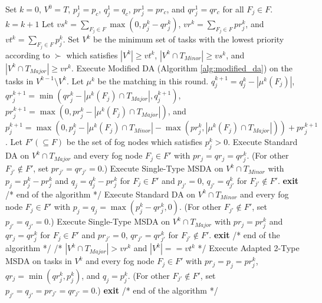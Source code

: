\begin{algorithm}[htbp]
\caption{Adapted 2-Type MSDA Algorithm}
\label{alg:two_type_msda}
\begin{algorithmic}[1]
\STATE Set $k = 0$, $V^0 = T$, $p_j^1 = p_c$, $q_j^1 = q_c$, $pr_j^1 = pr_c$, and $qr_j^1 = qr_c$ for all $F_j \in F$.
\REPEAT
    \STATE $k = k + 1$
    \STATE Let $vs^k = \sum_{F_j \in F} \max(0, p_j^k - qr_j^k)$, $vr^k = \sum_{F_j \in F} pr_j^k$, and $vt^k = \sum_{F_j \in F} p_j^k$.
    \STATE Set $V^k$ be the minimum set of tasks with the lowest priority according to $\succ$ which satisfies $|V^k| \geq vt^k$, $|V^k \cap T_{Minor}| \geq vs^k$, and $|V^k \cap T_{Major}| \geq vr^k$.
        \STATE Execute Modified DA (Algorithm \ref{alg:modified_da}) on the tasks in $V^{k-1} \setminus V^k$. Let $\mu^k$ be the matching in this round.
            \STATE $q_j^{k+1} = q_j^k - |\mu^k(F_j)|$,
            \STATE $qr_j^{k+1} = \min(qr_j^k - |\mu^k(F_j) \cap T_{Major}|, q_j^{k+1})$,
            \STATE $pr_j^{k+1} = \max(0, pr_j^k - |\mu^k(F_j) \cap T_{Major}|)$, and
            \STATE $p_j^{k+1} = \max(0, p_j^k - |\mu^k(F_j) \cap T_{Minor}| - \max(pr_j^k, |\mu^k(F_j) \cap T_{Major}|)) + pr_j^{k+1}$.
        \ENDFOR
    \ELSE
        \STATE Let $F' (\subseteq F)$ be the set of fog nodes which satisfies $p_j^k > 0$.
            \STATE Execute Standard DA on $V^k \cap T_{Major}$ and every fog node $F_j \in F'$ with $pr_j = qr_j = qr_j^k$. (For other $F_{j'} \notin F'$, set $pr_{j'} = qr_{j'} = 0$.)
            \STATE Execute Single-Type MSDA on $V^k \cap T_{Minor}$ with $p_j = p_j^k - pr_j^k$ and $q_j = q_j^k - pr_j^k$ for $F_j \in F'$ and $p_{j'} = 0$, $q_{j'} = q_{j'}^k$ for $F_{j'} \notin F'$.
            \STATE \textbf{exit} /* end of the algorithm */
            \STATE Execute Standard DA on $V^k \cap T_{Minor}$ and every fog node $F_j \in F'$ with $p_j = q_j = \max(p_j^k - qr_j^k, 0)$. (For other $F_{j'} \notin F'$, set $p_{j'} = q_{j'} = 0$.)
            \STATE Execute Single-Type MSDA on $V^k \cap T_{Major}$ with $pr_j = pr_j^k$ and $qr_j = qr_j^k$ for $F_j \in F'$ and $pr_{j'} = 0$, $qr_{j'} = qr_{j'}^k$ for $F_{j'} \notin F'$.
            \STATE \textbf{exit} /* end of the algorithm */
        \ELSE
            \STATE /* $|V^k \cap T_{Major}| > vr^k$ and $|V^k| == vt^k$ */
            \STATE Execute Adapted 2-Type MSDA on tasks in $V^k$ and every fog node $F_j \in F'$ with $pr_j = p_j = pr_j^k$, $qr_j = \min(qr_j^k, p_j^k)$, and $q_j = p_j^k$. (For other $F_{j'} \notin F'$, set $p_{j'} = q_{j'} = pr_{j'} = qr_{j'} = 0$.)
            \STATE \textbf{exit} /* end of the algorithm */
        \ENDIF
    \ENDIF
{}
\end{algorithmic}
\end{algorithm}

